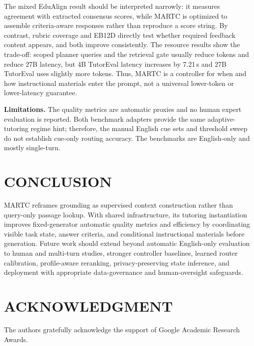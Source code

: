 \documentclass[letterpaper, 10 pt, conference]{ieeeconf}
\begin{document}
The mixed EduAlign result should be interpreted narrowly: it measures agreement with extracted consensus scores, while MARTC is optimized to assemble criteria-aware responses rather than reproduce a score string. By contrast, rubric coverage and EB12D directly test whether required feedback content appears, and both improve consistently. The resource results show the trade-off: scoped planner queries and the retrieval gate usually reduce tokens and reduce 27B latency, but 4B TutorEval latency increases by 7.21\,s and 27B TutorEval uses slightly more tokens. Thus, MARTC is a controller for when and how instructional materials enter the prompt, not a universal lower-token or lower-latency guarantee.

\noindent\textbf{Limitations.} The quality metrics are automatic proxies and no human expert evaluation is reported. Both benchmark adapters provide the same adaptive-tutoring regime hint; therefore, the manual English cue sets and threshold sweep do not establish cue-only routing accuracy. The benchmarks are English-only and mostly single-turn.

\section{CONCLUSION}
\label{sec:conclusion}

\textsc{MARTC} reframes grounding as supervised context construction rather than query-only passage lookup. With shared infrastructure, its tutoring instantiation improves fixed-generator automatic quality metrics and efficiency by coordinating visible task state, answer criteria, and conditional instructional materials before generation. Future work should extend beyond automatic English-only evaluation to human and multi-turn studies, stronger controller baselines, learned router calibration, profile-aware reranking, privacy-preserving state inference, and deployment with appropriate data-governance and human-oversight safeguards.

\section*{ACKNOWLEDGMENT}
The authors gratefully acknowledge the support of Google Academic Research Awards.



\end{document}
